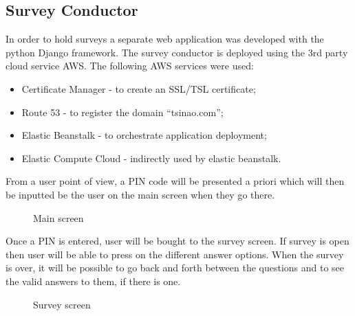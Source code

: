 \documentclass[12pt, fleqn, a4paper]{article}
\begin{document}
\subsection{Survey Conductor}
In order to hold surveys a separate web application was developed with the python Django framework. The survey conductor is deployed using the 3rd party cloud service AWS. The following AWS services were used:
\begin{itemize}
	\item Certificate Manager - to create an SSL/TSL certificate;
	\item Route 53 - to register the domain \enquote{tsinao.com};
	\item Elastic Beanstalk - to orchestrate application deployment;
	\item Elastic Compute Cloud - indirectly used by elastic beanstalk.
\end{itemize}
From a user point of view, a PIN code will be presented a priori which will then be inputted be the user on the main screen when they go there.
\begin{figure}[H]
	\centering
	\caption{Main screen}
\end{figure}
Once a PIN is entered, user will be bought to the survey screen. If survey is open then user will be able to press on the different answer options. When the survey is over, it will be possible to go back and forth between the questions and to see the valid answers to them, if there is one.
\begin{figure}[H]
	\centering
	\caption{Survey screen}
\end{figure}
\end{document}
